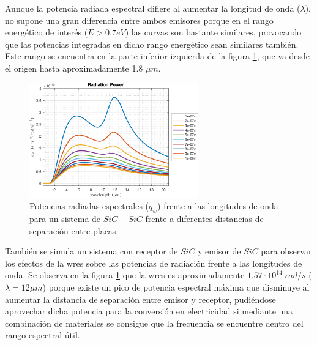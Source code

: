 Aunque la potencia radiada espectral difiere al aumentar la longitud de onda ($\lambda$), no supone una gran diferencia entre ambos emisores porque en el rango energético de interés ($E>0.7eV$) las curvas son bastante similares, provocando que las potencias integradas en dicho rango energético sean similares también. Este rango se encuentra en la parte inferior izquierda de la figura \ref{fig:SiCSiC}, que va desde el origen hasta aproximadamente 1.8 $\mu m$.
\begin{figure}[H]
	\centering
		\includegraphics[width=0.65\textwidth]{figuras/Resultados/radiacion/SiCSiC.pdf}
	\caption{Potencias radiadas espectrales ($q_w$) frente a las longitudes de onda para un sistema de $SiC-SiC$ frente a diferentes distancias de separación entre placas.}
	\label{fig:SiCSiC}
\end{figure}
También se simula un sistema con receptor de $SiC$ y emisor de $SiC$ para observar los efectos de la \gls{wres} sobre las potencias de radiación frente a las longitudes de onda. Se observa en la figura \ref{fig:SiCSiC} que la \gls{wres} es aproximadamente $1.57\cdot 10^{14} \ rad/s$ ($\lambda = 12\mu m$) porque existe un pico de potencia espectral máxima que disminuye al aumentar la distancia de separación entre emisor y receptor, pudiéndose aprovechar dicha potencia para la conversión en electricidad si mediante una combinación de materiales se consigue que la frecuencia se encuentre dentro del rango espectral útil.
